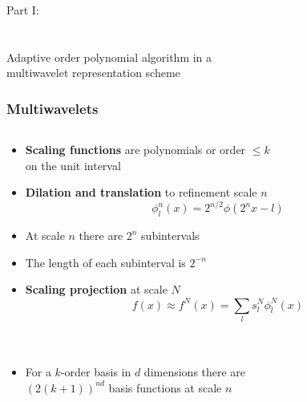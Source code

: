 \begin{frame}
    \centering
    \Large{Part I:}\\
    \ \\
    \ \\
    \centering
    \Large{Adaptive order polynomial algorithm in a\\
	    multiwavelet representation scheme}
\end{frame}

\begin{frame}
    \frametitle{Multiwavelets}
    \begin{columns}
    \begin{column}[b]{0.55\linewidth}
	\begin{itemize}
	    \item   \textbf{Scaling functions} are polynomials or order $\leq k$\\
		    on the unit interval
	    \item   \textbf{Dilation and translation} to refinement scale $n$
		    \begin{equation}
			\nonumber
			\phi_l^n(x) = 2^{n/2}\phi(2^nx-l)
		    \end{equation}
	    \item   At scale $n$ there are $2^n$ subintervals
	    \item   The length of each subinterval is $2^{-n}$
	    \item   \textbf{Scaling projection} at scale $N$
		    \begin{equation}
			\nonumber
			f(x) \approx f^N(x) = \sum_l s_l^N \phi_l^N(x)
		    \end{equation}
		    \ \\
		    \ \\
	    \item   For a $k$-order basis in $d$ dimensions there are\\
		    $\left(2(k+1)\right)^{nd}$ basis functions at scale $n$\\
	\end{itemize}
	\centering

\end{column}
\end{columns}
\end{frame}
